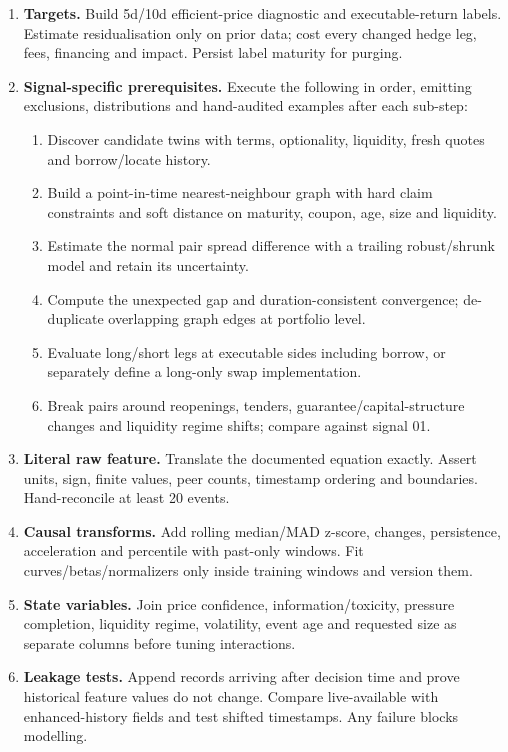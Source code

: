 \documentclass[10pt]{article}
\begin{document}
\begin{enumerate}[leftmargin=2em,label=\textbf{A\arabic*.}]
\item \textbf{Targets.} Build 5d/10d efficient-price diagnostic and executable-return labels. Estimate residualisation only on prior data; cost every changed hedge leg, fees, financing and impact. Persist label maturity for purging.
\item \textbf{Signal-specific prerequisites.} Execute the following in order, emitting exclusions, distributions and hand-audited examples after each sub-step:
\begin{enumerate}[label=\alph*)]
\item Discover candidate twins with terms, optionality, liquidity, fresh quotes and borrow/locate history.
\item Build a point-in-time nearest-neighbour graph with hard claim constraints and soft distance on maturity, coupon, age, size and liquidity.
\item Estimate the normal pair spread difference with a trailing robust/shrunk model and retain its uncertainty.
\item Compute the unexpected gap and duration-consistent convergence; de-duplicate overlapping graph edges at portfolio level.
\item Evaluate long/short legs at executable sides including borrow, or separately define a long-only swap implementation.
\item Break pairs around reopenings, tenders, guarantee/capital-structure changes and liquidity regime shifts; compare against signal 01.
\end{enumerate}
\item \textbf{Literal raw feature.} Translate the documented equation exactly. Assert units, sign, finite values, peer counts, timestamp ordering and boundaries. Hand-reconcile at least 20 events.
\item \textbf{Causal transforms.} Add rolling median/MAD z-score, changes, persistence, acceleration and percentile with past-only windows. Fit curves/betas/normalizers only inside training windows and version them.
\item \textbf{State variables.} Join price confidence, information/toxicity, pressure completion, liquidity regime, volatility, event age and requested size as separate columns before tuning interactions.
\item \textbf{Leakage tests.} Append records arriving after decision time and prove historical feature values do not change. Compare live-available with enhanced-history fields and test shifted timestamps. Any failure blocks modelling.

\end{enumerate}
\end{document}
